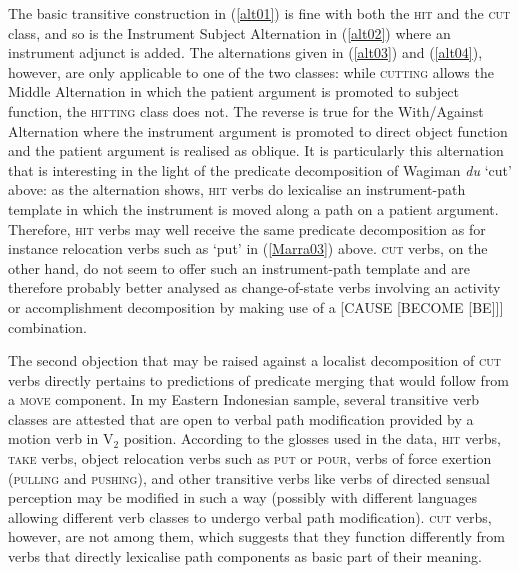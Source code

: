 The basic transitive construction in (\ref{alt01}) is fine with both the \textsc{hit} and the \textsc{cut} class, and so is the Instrument Subject Alternation in (\ref{alt02}) where an instrument adjunct is added. The alternations given in (\ref{alt03}) and (\ref{alt04}), however, are only applicable to one of the two classes: while \textsc{cutting} allows the Middle Alternation in which the patient argument is promoted to subject function, the \textsc{hitting} class does not. The reverse is true for the With/Against Alternation where the instrument argument is promoted to direct object function and the patient argument is realised as oblique. It is particularly this alternation that is interesting in the light of the predicate decomposition of Wagiman \textit{du} `cut' above: as the alternation shows, \textsc{hit} verbs do lexicalise an instrument-path template in which the instrument is moved along a path on a patient argument. Therefore, \textsc{hit} verbs may well receive the same predicate decomposition as for instance relocation verbs such as `put' in (\ref{Marra03}) above. \textsc{cut} verbs, on the other hand, do not seem to offer such an instrument-path template and are therefore probably better analysed as change-of-state verbs involving an activity or accomplishment decomposition by making use of a [CAUSE [BECOME [BE]]] combination.

The second objection that may be raised against a localist decomposition of \textsc{cut} verbs directly pertains to  predictions of predicate merging that would follow from a \textsc{move} component. In my Eastern Indonesian sample, several transitive verb classes are attested that are open to verbal path modification provided by a motion verb in V$_2$ position. According to the glosses used in the data, \textsc{hit} verbs, \textsc{take} verbs, object relocation verbs such as \textsc{put} or \textsc{pour}, verbs of force exertion (\textsc{pulling} and \textsc{pushing}), and other transitive verbs like verbs of directed sensual perception may be modified in such a way (possibly with different languages allowing different verb classes to undergo verbal path modification). \textsc{cut} verbs, however, are not among them, which suggests that they function differently from verbs that directly lexicalise path components as basic part of their meaning.

